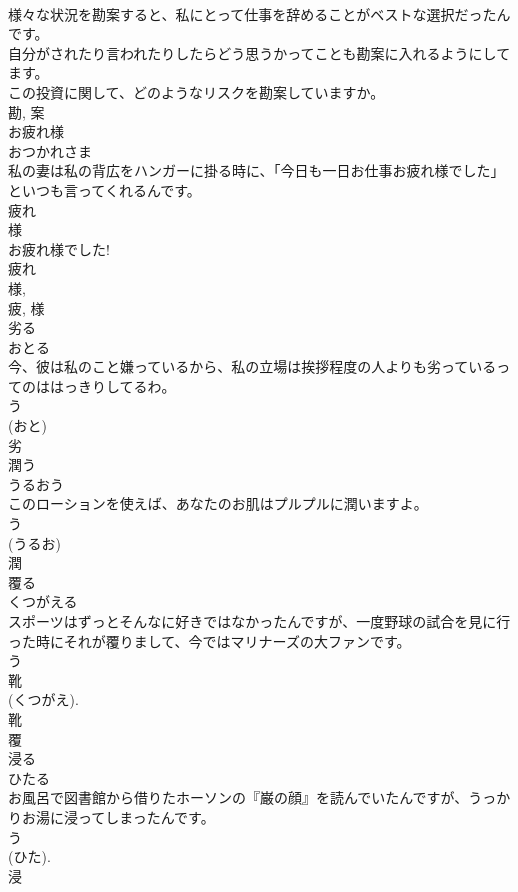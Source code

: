 \documentclass[8pt]{extreport}
\begin{document}
\begin{CJK}{UTF8}{min}
\\	様々な状況を勘案すると、私にとって仕事を辞めることがベストな選択だったんです。	
\\	自分がされたり言われたりしたらどう思うかってことも勘案に入れるようにしてます。	
\\	この投資に関して、どのようなリスクを勘案していますか。	
\\	勘, 案	
\\	お疲れ様	
\\	おつかれさま	
\\	私の妻は私の背広をハンガーに掛る時に、「今日も一日お仕事お疲れ様でした」といつも言ってくれるんです。	
\\	疲れ 
\\	様 
\\	お疲れ様でした! 
\\	疲れ 
\\	様, 
\\	疲, 様	
\\	劣る	
\\	おとる	
\\	今、彼は私のこと嫌っているから、私の立場は挨拶程度の人よりも劣っているってのははっきりしてるわ。	
\\	う 
\\	(おと) 
\\	劣	
\\	潤う	
\\	うるおう	
\\	このローションを使えば、あなたのお肌はプルプルに潤いますよ。	
\\	う 
\\	(うるお) 
\\	潤	
\\	覆る	
\\	くつがえる	
\\	スポーツはずっとそんなに好きではなかったんですが、一度野球の試合を見に行った時にそれが覆りまして、今ではマリナーズの大ファンです。	
\\	う 
\\	靴 
\\	(くつがえ). 
\\	靴 
\\	覆	
\\	浸る	
\\	ひたる	
\\	お風呂で図書館から借りたホーソンの『巌の顔』を読んでいたんですが、うっかりお湯に浸ってしまったんです。	
\\	う 
\\	(ひた). 
\\	浸	

\end{CJK}
\end{document}
